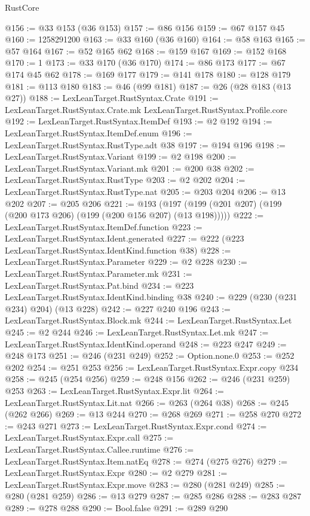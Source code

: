 \begin{lexlean}{RustCore}
\begin{coremodule}
@156 := @33 @153 (@36 @153)
@157 := @86 @156
@159 := @67 @157 @45
@160 := 1258291200
@163 := @33 @160 (@36 @160)
@164 := @58 @163
@165 := @57 @164
@167 := @52 @165 @62
@168 := @159 @167
@169 := @152 @168
@170 := 1
@173 := @33 @170 (@36 @170)
@174 := @86 @173
@177 := @67 @174 @45 @62
@178 := @169 @177
@179 := @141 @178
@180 := @128 @179
@181 := @113 @180
@183 := @46 (@99 @181)
@187 := @26 (@28 @183 (@13 @27))
@188 := LexLeanTarget.RustSyntax.Crate
@191 := LexLeanTarget.RustSyntax.Crate.mk LexLeanTarget.RustSyntax.Profile.core
@192 := LexLeanTarget.RustSyntax.ItemDef
@193 := @2 @192
@194 := LexLeanTarget.RustSyntax.ItemDef.enum
@196 := LexLeanTarget.RustSyntax.RustType.adt @38
@197 := @194 @196
@198 := LexLeanTarget.RustSyntax.Variant
@199 := @2 @198
@200 := LexLeanTarget.RustSyntax.Variant.mk
@201 := @200 @38
@202 := LexLeanTarget.RustSyntax.RustType
@203 := @2 @202
@204 := LexLeanTarget.RustSyntax.RustType.nat
@205 := @203 @204
@206 := @13 @202
@207 := @205 @206
@221 := @193 (@197 (@199 (@201 @207) (@199 (@200 @173 @206) (@199 (@200 @156 @207) (@13 @198)))))
@222 := LexLeanTarget.RustSyntax.ItemDef.function
@223 := LexLeanTarget.RustSyntax.Ident.generated
@227 := @222 (@223 LexLeanTarget.RustSyntax.IdentKind.function @38)
@228 := LexLeanTarget.RustSyntax.Parameter
@229 := @2 @228
@230 := LexLeanTarget.RustSyntax.Parameter.mk
@231 := LexLeanTarget.RustSyntax.Pat.bind
@234 := @223 LexLeanTarget.RustSyntax.IdentKind.binding @38
@240 := @229 (@230 (@231 @234) @204) (@13 @228)
@242 := @227 @240 @196
@243 := LexLeanTarget.RustSyntax.Block.mk
@244 := LexLeanTarget.RustSyntax.Let
@245 := @2 @244
@246 := LexLeanTarget.RustSyntax.Let.mk
@247 := LexLeanTarget.RustSyntax.IdentKind.operand
@248 := @223 @247
@249 := @248 @173
@251 := @246 (@231 @249)
@252 := Option.none.{0}
@253 := @252 @202
@254 := @251 @253
@256 := LexLeanTarget.RustSyntax.Expr.copy @234
@258 := @245 (@254 @256)
@259 := @248 @156
@262 := @246 (@231 @259) @253
@263 := LexLeanTarget.RustSyntax.Expr.lit
@264 := LexLeanTarget.RustSyntax.Lit.nat
@266 := @263 (@264 @38)
@268 := @245 (@262 @266)
@269 := @13 @244
@270 := @268 @269
@271 := @258 @270
@272 := @243 @271
@273 := LexLeanTarget.RustSyntax.Expr.cond
@274 := LexLeanTarget.RustSyntax.Expr.call
@275 := LexLeanTarget.RustSyntax.Callee.runtime
@276 := LexLeanTarget.RustSyntax.Item.natEq
@278 := @274 (@275 @276)
@279 := LexLeanTarget.RustSyntax.Expr
@280 := @2 @279
@281 := LexLeanTarget.RustSyntax.Expr.move
@283 := @280 (@281 @249)
@285 := @280 (@281 @259)
@286 := @13 @279
@287 := @285 @286
@288 := @283 @287
@289 := @278 @288
@290 := Bool.false
@291 := @289 @290

\end{coremodule}
\end{lexlean}
